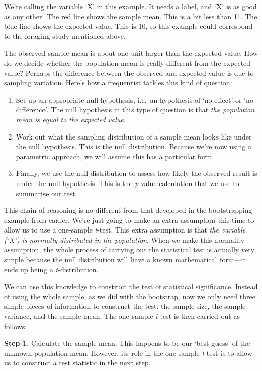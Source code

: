\documentclass[
]{book}
\begin{document}
We're calling the variable `X' in this example. It needs a label, and `X' is as good as any other. The red line shows the sample mean. This is a bit less than 11. The blue line shows the expected value. This is 10, so this example could correspond to the foraging study mentioned above.

The observed sample mean is about one unit larger than the expected value. How do we decide whether the population mean is really different from the expected value? Perhaps the difference between the observed and expected value is due to sampling variation. Here's how a frequentist tackles this kind of question:

\begin{enumerate}
\def\labelenumi{\arabic{enumi}.}
\item
  Set up an appropriate null hypothesis, i.e.~an hypothesis of `no effect' or `no difference'. The null hypothesis in this type of question is that \emph{the population mean is equal to the expected value}.
\item
  Work out what the sampling distribution of a sample mean looks like under the null hypothesis. This is the null distribution. Because we're now using a parametric approach, we will assume this has a particular form.
\item
  Finally, we use the null distribution to assess how likely the observed result is under the null hypothesis. This is the \emph{p}-value calculation that we use to summarise our test.
\end{enumerate}

This chain of reasoning is no different from that developed in the bootstrapping example from earlier. We're just going to make an extra assumption this time to allow us to use a one-sample \emph{t}-test. This extra assumption is that \emph{the variable (`X') is normally distributed in the population}. When we make this normality assumption, the whole process of carrying out the statistical test is actually very simple because the null distribution will have a known mathematical form---it ends up being a \emph{t}-distribution.

We can use this knowledge to construct the test of statistical significance. Instead of using the whole sample, as we did with the bootstrap, now we only need three simple pieces of information to construct the test: the sample size, the sample variance, and the sample mean. The one-sample \emph{t}-test is then carried out as follows:

\textbf{Step 1.} Calculate the sample mean. This happens to be our `best guess' of the unknown population mean. However, its role in the one-sample \emph{t}-test is to allow us to construct a test statistic in the next step.
\end{document}
